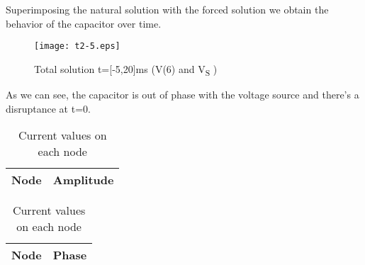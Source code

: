 Superimposing the natural solution with the forced solution we obtain the behavior of the capacitor over time.

\begin{figure}[h] \centering
\texttt{[image: t2-5.eps]}
\caption{Total solution t=[-5,20]ms (V(6) and V\textsubscript S )}
\label{fig:natural}
\end{figure}

As we can see, the capacitor is out of phase with the voltage source and there's a disruptance at t=0.

\begin{table}[!htb]
    \begin{minipage}{.5\linewidth}
      
      \centering
        \begin{tabular}{|c|c|}
        \hline    
        {\bf Node} & {\bf Amplitude} \\ \hline
        
        \end{tabular}
        \caption{Amplitude values on each node}
    \end{minipage}%
    \begin{minipage}{.5\linewidth}
      \centering
        
        \begin{tabular}{|c|c|}
        \hline    
        {\bf Node} & {\bf Phase} \\ \hline
        
        \end{tabular}
        \caption{Current values on each node }
    \end{minipage} 
\end{table}



